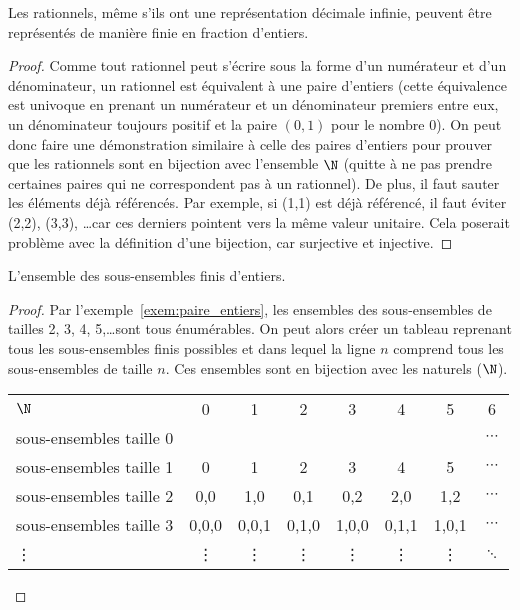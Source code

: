 \begin{myexem}
 Les rationnels, même s'ils ont une représentation décimale infinie, peuvent être représentés de manière finie en fraction d'entiers.
	 \begin{proof}
	 	 Comme tout rationnel peut s'écrire sous la forme d'un numérateur et d'un dénominateur, un rationnel est équivalent à une paire d'entiers (cette équivalence est univoque en prenant un numérateur et un dénominateur premiers entre eux, un dénominateur toujours positif et la paire $(0,1)$ pour le nombre $0$). On peut donc faire une démonstration similaire à celle des paires d'entiers pour prouver que les rationnels sont en bijection avec l'ensemble $\N$ (quitte à ne pas prendre certaines paires qui ne correspondent pas à un rationnel). De plus, il faut sauter les éléments déjà référencés. Par exemple, si (1,1) est déjà référencé, il faut éviter (2,2), (3,3), \ldots car ces derniers pointent vers la même valeur unitaire. Cela poserait problème avec la définition d'une bijection, car surjective et injective.
	 \end{proof}
 \end{myexem}

\begin{myexem}
  L'ensemble des sous-ensembles finis d'entiers.
  \begin{proof}
  Par l'exemple~\ref{exem:paire_entiers}, les ensembles des sous-ensembles de tailles 2, 3, 4, 5,\dots sont tous énumérables. On peut alors créer un tableau reprenant tous les sous-ensembles finis possibles et dans lequel la ligne $n$ comprend tous les sous-ensembles de taille $n$. Ces ensembles sont en bijection avec les naturels ($\N$).

    \begin{tabular}{ l c c  c  c c c  c }
 	 $\N$ & 0 & 1 & 2  & 3 & 4 & 5 & 6  \\
 	 sous-ensembles  taille 0  & {} & {} & {} & {} & {} & {}  & $\cdots$ \\
 	 sous-ensembles  taille 1  & {0} & {1} & {2} & {3} & {4} & {5} & $\cdots$ \\
 	 sous-ensembles  taille 2  & {0,0} & {1,0} & {0,1} & {0,2} & {2,0} & {1,2}  & $\cdots$ \\
 	 sous-ensembles  taille 3  & {0,0,0} & {0,0,1} & {0,1,0} & {1,0,0} & {0,1,1} & {1,0,1}  & $\cdots$ \\
 	 \vdots  & {\vdots} & {\vdots} & {\vdots} & {\vdots} & {\vdots} & {\vdots}  & $\ddots$ \\
	\end{tabular}
  \end{proof}
\end{myexem}

